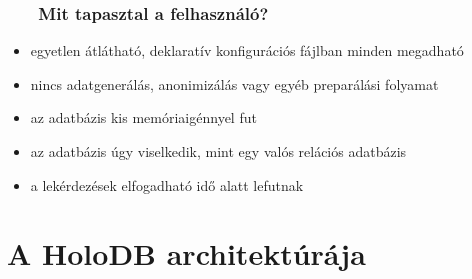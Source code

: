 \documentclass[
]{beamer}
\newcommand{\slidetitle}[2]{\frametitle{{\small #1 ~ \ding{226} ~ } \normalsize \textbf{#2} }}
\begin{document}
\begin{frame}
    \slidetitle{\sectionshorttitle}{Mit tapasztal a felhasználó?}
    
    
    \begin{itemize}
        \setlength\itemsep{1em}
        \item egyetlen átlátható, deklaratív konfigurációs fájlban minden megadható
        \item nincs adatgenerálás, anonimizálás vagy egyéb preparálási folyamat
        \item az adatbázis kis memóriaigénnyel fut
        \item az adatbázis úgy viselkedik, mint egy valós relációs adatbázis
        \item a lekérdezések elfogadható idő alatt lefutnak
    \end{itemize}
\end{frame}

\section{A HoloDB architektúrája}
\def\sectionshorttitle{Architektúra}
\end{document}
